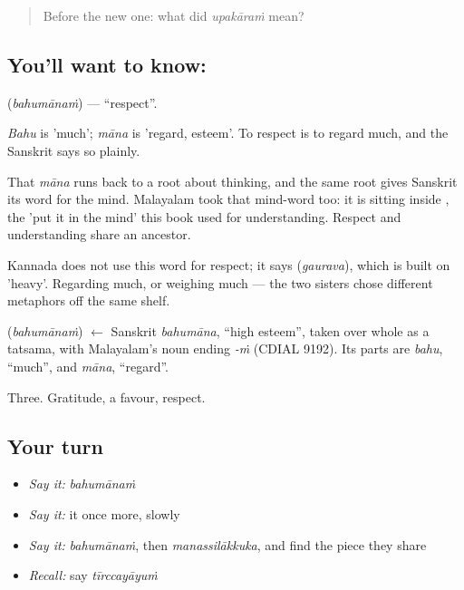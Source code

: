\label{lesson:ML-C51-respect}



\begin{quote}
Before the new one: what did \emph{upakāraṁ} mean?
\end{quote}

\subsection*{You'll want to know: }
\textbf{} (\emph{bahumānaṁ}) — \textquotedblleft{}respect\textquotedblright{}.

\emph{Bahu} is 'much'; \emph{māna} is 'regard, esteem'. To respect is to regard much, and the Sanskrit says so plainly.

That \emph{māna} runs back to a root about thinking, and the same root gives Sanskrit its word for the mind. Malayalam took that mind-word too: it is sitting inside , the 'put it in the mind' this book used for understanding. Respect and understanding share an ancestor.

Kannada does not use this word for respect; it says  (\emph{gaurava}), which is built on 'heavy'. Regarding much, or weighing much — the two sisters chose different metaphors off the same shelf.

\begin{cousinweb}
\textbf{} (\emph{bahumānaṁ}) $\leftarrow$ Sanskrit \emph{bahumāna}, \textquotedblleft{}high esteem\textquotedblright{}, taken over whole as a tatsama, with Malayalam's noun ending \emph{-ṁ} (CDIAL 9192). Its parts are \emph{bahu}, \textquotedblleft{}much\textquotedblright{}, and \emph{māna}, \textquotedblleft{}regard\textquotedblright{}.
\end{cousinweb}

\begin{grammarlens}[title={What you've built}]
Three. Gratitude, a favour, respect.
\end{grammarlens}

\subsection*{Your turn}
\begin{itemize}
\raggedright
  \item \emph{Say it:} \emph{bahumānaṁ}
  \item \emph{Say it:} it once more, slowly
  \item \emph{Say it:} \emph{bahumānaṁ}, then \emph{manassilākkuka}, and find the piece they share
  \item \emph{Recall:} say \emph{tīrccayāyuṁ}
\end{itemize}

